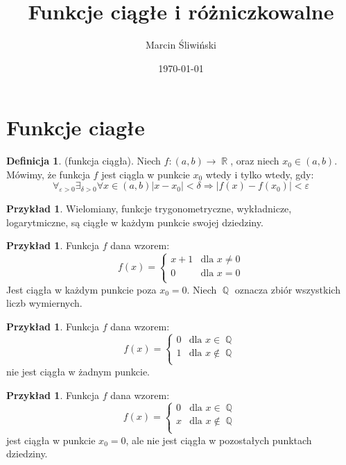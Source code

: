 \documentclass[12pt,a4paper]{article}
\title{Funkcje ciągłe i różniczkowalne}
\date{\today}
\author{Marcin Śliwiński}
\theoremstyle{definition}
\newtheorem{df}[tw]{Definicja}
\newtheorem{ex}[tw]{Przykład}
\DeclareMathOperator{\R}{\mathbb{R}}
\DeclareMathOperator{\Q}{\mathbb{Q}}
\begin{document}
\maketitle

\tableofcontents

\section{Funkcje ciagłe}
\begin{df}
(funkcja ciągła). Niech $f:(a,b)\rightarrow\R$, oraz niech $x_0\in(a,b)$. Mówimy, że funkcja $f$ jest ciągla w punkcie $x_0$ wtedy i tylko wtedy, gdy:
\[\forall_{\varepsilon>0}\exists_{\delta>0}\forall{x \in (a,b) |x-x_0|} < \delta \Rightarrow |f(x) - f(x_0)| < \varepsilon\]
\end{df}
\begin{ex}
Wielomiany, funkcje trygonometryczne, wykładnicze, logarytmiczne,  są ciągłe w każdym punkcie swojej dziedziny.
\end{ex}

\begin{ex}
Funkcja $f$ dana wzorem:
\begin{displaymath}
f(x)= \left\{ \begin{array}{ll}
x+1 & \textrm{dla $x\neq0$}\\
0 & \textrm{dla $x=0$}\\
\end{array} \right.
\end{displaymath}
Jest ciągła w każdym punkcie poza $x_0=0$.
\newline Niech $\Q$ oznacza zbiór wszystkich liczb wymiernych.
\end{ex}
\begin{ex}
Funkcja $f$ dana wzorem:
\begin{displaymath}
f(x)= \left\{ \begin{array}{ll}
0 & \textrm{dla $x\in\Q$}\\
1 & \textrm{dla $x\notin\Q$}\\
\end{array} \right.
\end{displaymath}
nie jest ciągła w żadnym punkcie.
\end{ex}
\begin{ex}
Funkcja $f$ dana wzorem:
\begin{displaymath}
f(x)= \left\{ \begin{array}{ll}
0 & \textrm{dla $x\in\Q$}\\
x & \textrm{dla $x\notin\Q$}\\
\end{array} \right.
\end{displaymath}
jest ciągła w punkcie $x_0=0$, ale nie jest ciągła w pozostałych punktach dziedziny.
\end{ex}
\end{document}
